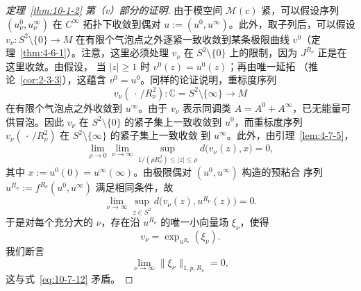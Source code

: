 \begin{proof}[定理~\ref{thm:10-1-2} 第（v）部分的证明]
由于模空间 $\mathcal M(c)$ 紧，可以假设序列
$(u_\nu^0,u_\nu^\infty)$ 在 $C^\infty$ 拓扑下收敛到偶对
$u:=(u^0,u^\infty)$。此外，取子列后，可以假设
$v_\nu:S^2\setminus\{0\}\to M$ 在有限个气泡点之外逐紧一致收敛到某条极限曲线
$v^0$（定理~\ref{thm:4-6-1}）。注意，这里必须处理 $v_\nu$ 在
$S^2\setminus\{0\}$ 上的限制，因为 $J^{R_\nu}$ 正是在这里收敛。由假设，
当 $|z|\geq1$ 时 $v^0(z)=u^0(z)$；再由唯一延拓
（推论~\ref{cor:2-3-3}），这蕴含 $v^0=u^0$。同样的论证说明，重标度序列
\[
  v_\nu(\,\cdot\,/R_\nu^2):
  \mathbb C=S^2\setminus\{\infty\}\longrightarrow M
\]
在有限个气泡点之外收敛到 $u^\infty$。由于 $v_\nu$ 表示同调类
$A=A^0+A^\infty$，已无能量可供冒泡。因此 $v_\nu$ 在
$S^2\setminus\{0\}$ 的紧子集上一致收敛到 $u^0$，而重标度序列
$v_\nu(\,\cdot\,/R_\nu^2)$ 在 $S^2\setminus\{\infty\}$ 的紧子集上一致收敛
到 $u^\infty$。此外，由引理~\ref{lem:4-7-5}，
\[
  \lim_{\rho\to0}\lim_{\nu\to\infty}
  \sup_{1/(\rho R_\nu^2)\leq|z|\leq\rho}
  d\bigl(v_\nu(z),x\bigr)=0,
\]
其中 $x:=u^0(0)=u^\infty(\infty)$。由极限偶对 $(u^0,u^\infty)$ 构造的预粘合
序列 $u^{R_\nu}:=f^{R_\nu}(u^0,u^\infty)$ 满足相同条件，故
\[
  \lim_{\nu\to\infty}\sup_{z\in S^2}
  d\bigl(v_\nu(z),u^{R_\nu}(z)\bigr)=0.
\]
于是对每个充分大的 $\nu$，存在沿 $u^{R_\nu}$ 的唯一小向量场 $\xi_\nu$，使得
\[
  v_\nu=\exp_{u^{R_\nu}}(\xi_\nu).
\]
我们断言
\begin{equation}\label{eq:10-7-13}
  \lim_{\nu\to\infty}\lVert\xi_\nu\rVert_{1,p,R_\nu}=0,
\end{equation}
这与式~\eqref{eq:10-7-12} 矛盾。


\end{proof}
